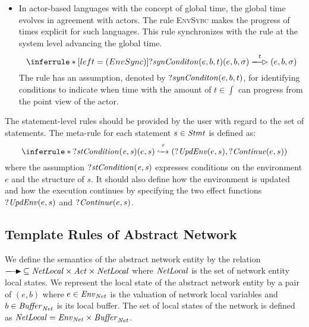 \begin{itemize}

\item In actor-based languages with the concept of global time, the global time evolves in agreement with actors. The rule \textsc{EnvSybc} makes the progress of times explicit for such languages. This rule synchronizes with the rule at the system level advancing the global time.
\[
\inferrule*[left = (EnvSync)]{?{\it synConditon}(e,b,t)}{(e,b,\sigma)\aoverto{t}(e,b,\sigma)}
\]The rule has an assumption, denoted by $?{\it synConditon}(e,b,t)$, for identifying conditions to indicate when time with  the amount of $t\in \int$ can progress from the point view of the actor.  %
\end{itemize}


The statement-level rules should be provided by the user with regard to the set of statements. The meta-rule for each statement $s\in\mathit{Stmt}$ is defined as:
\[
\inferrule*{?{\it stCondition(e,s)}}{(e,s)\stoverto{\tau}(?{\it UpdEnv}(e,s),?{\it Continue}(e,s))}
\]where the assumption $?{\it stCondition(e,s)}$ expresses conditions on the environment $e$ and the structure of $s$. It should also define how the environment is updated and how the execution continues by specifying the two effect functions $?{\it UpdEnv}(e,s)$ and $?{\it Continue}(e,s)$. 
\subsection{Template Rules of Abstract Network}
We define the semantics of the abstract network entity by the relation $\noverto{}\,\subseteq {\it NetLocal}\times\Act \times {\it NetLocal}$ where ${\it NetLocal}$ is the set of network entity local states. We represent the local state of the abstract network entity by a pair of $(e,b)$ where $e\in\mathit{Env}_{\it Net}$ is the valuation of network local variables and $b\in\mathit{Buffer}_{\it Net}$ is its local buffer.  The set of local states of the network is defined as ${\it NetLocal}=\mathit{Env}_{\it Net}\times \mathit{Buffer}_{\it Net}$.

